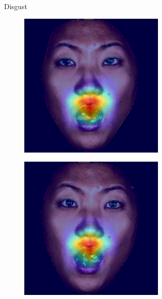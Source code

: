\begin{figure}[ht]
\begin{subfigure}{0.45\textwidth}
\begin{subfigure}{0.45\textwidth}
        \end{subfigure}
        \caption{Disgust}
    \end{subfigure}
    \hspace{0.05\textwidth} %
    \begin{subfigure}{0.45\textwidth}
        \centering
        \begin{subfigure}{0.45\textwidth}
            \includegraphics[width=\linewidth]{Images/Heatmaps/heatmap_surprise_1.png}
        \end{subfigure}
        \begin{subfigure}{0.45\textwidth}
            \includegraphics[width=\linewidth]{Images/Heatmaps/heatmap_surprise_2.png}

\end{subfigure}
\end{subfigure}
\end{figure}
